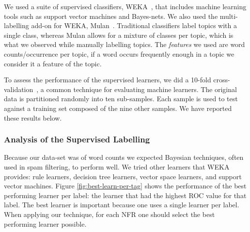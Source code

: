 \documentclass[smallextended]{svjour3}       %
\begin{document}
We used a suite of supervised classifiers, WEKA~\cite{weka09},
that includes machine learning tools such as support vector machines and Bayes-nets. 
We also used the multi-labelling add-on for WEKA, Mulan~\cite{mulan}. %
Traditional classifiers label topics with a single class, whereas Mulan allows for a mixture of classes per topic, which is what we observed while
manually labelling topics.
The \emph{features} we used are word counts/occurrence	per topic, if
a word occurs frequently enough in a topic we consider it a feature of
the topic.

To assess the performance of the supervised learners, we did a 10-fold cross-validation~\cite{Kohavi1995}, a common technique for evaluating machine
learners. 
The original data is partitioned randomly into ten sub-samples. Each sample is used to test against a training set composed of the nine other samples.
We have reported these results below.%

\subsubsection{Analysis of the Supervised Labelling}
Because our data-set was of word counts we expected Bayesian techniques, often used in spam filtering, to perform well. 
We tried other learners that WEKA~\cite{weka09} provides: rule learners, decision tree learners, vector space learners, and support vector machines.  
Figure \ref{fig:best-learn-per-tag} shows the performance of the best
performing learner per label: 
the learner that had the highest ROC value for that label. 
The best learner is important because one uses a single learner per
label. When applying our technique, for each NFR one should select the
best performing learner possible.
\end{document}
